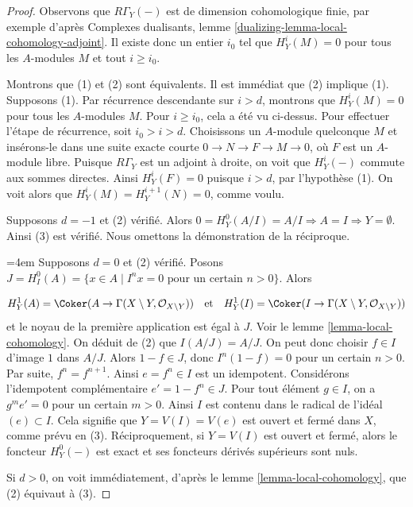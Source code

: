 \begin{proof}
Observons que $R\Gamma_Y(-)$ est de dimension cohomologique finie, par exemple d'après Complexes dualisants, lemme \ref{dualizing-lemma-local-cohomology-adjoint}. Il existe donc un entier $i_0$ tel que $H^i_Y(M) = 0$ pour tous les $A$-modules $M$ et tout $i \geq i_0$.

\medskip\noindent
Montrons que (1) et (2) sont équivalents. Il est immédiat que (2) implique (1). Supposons (1). Par récurrence descendante sur $i > d$, montrons que $H^i_Y(M) = 0$ pour tous les $A$-modules $M$. Pour $i \geq i_0$, cela a été vu ci-dessus. Pour effectuer l'étape de récurrence, soit $i_0 > i > d$. Choisissons un $A$-module quelconque $M$ et insérons-le dans une suite exacte courte $0 \to N \to F \to M \to 0$, où $F$ est un $A$-module libre. Puisque $R\Gamma_Y$ est un adjoint à droite, on voit que $H^i_Y(-)$ commute aux sommes directes. Ainsi $H^i_Y(F) = 0$ puisque $i > d$, par l'hypothèse (1). On voit alors que $H^i_Y(M) = H^{i + 1}_Y(N) = 0$, comme voulu.

\medskip\noindent
Supposons $d = -1$ et (2) vérifié. Alors $0 = H^0_Y(A/I) = A/I \Rightarrow A = I
\Rightarrow Y = \emptyset$. Ainsi (3) est vérifié. Nous omettons la démonstration de la réciproque.

\medskip\noindent
{\emergencystretch=4em
Supposons $d = 0$ et (2) vérifié. Posons $J = H^0_I(A) = \{x \in A \mid I^nx = 0 \text{ pour un certain }n > 0\}$. Alors
\par}
$$
H^1_Y(A) = \Coker(A \to \Gamma(X \setminus Y, \mathcal{O}_{X \setminus Y}))
\quad\text{et}\quad
H^1_Y(I) = \Coker(I \to \Gamma(X \setminus Y, \mathcal{O}_{X \setminus Y}))
$$
et le noyau de la première application est égal à $J$. Voir le lemme \ref{lemma-local-cohomology}. On déduit de (2) que $I(A/J) = A/J$. On peut donc choisir $f \in I$ d'image $1$ dans $A/J$. Alors $1 - f \in J$, donc $I^n(1 - f) = 0$ pour un certain $n > 0$. Par suite, $f^n = f^{n + 1}$. Ainsi $e = f^n \in I$ est un idempotent. Considérons l'idempotent complémentaire $e' = 1 - f^n \in J$. Pour tout élément $g \in I$, on a $g^m e' = 0$ pour un certain $m > 0$. Ainsi $I$ est contenu dans le radical de l'idéal $(e) \subset I$. Cela signifie que $Y = V(I) = V(e)$ est ouvert et fermé dans $X$, comme prévu en (3). Réciproquement, si $Y = V(I)$ est ouvert et fermé, alors le foncteur $H^0_Y(-)$ est exact et ses foncteurs dérivés supérieurs sont nuls.

\medskip\noindent
Si $d > 0$, on voit immédiatement, d'après le lemme \ref{lemma-local-cohomology}, que (2) équivaut à (3).
\end{proof}

